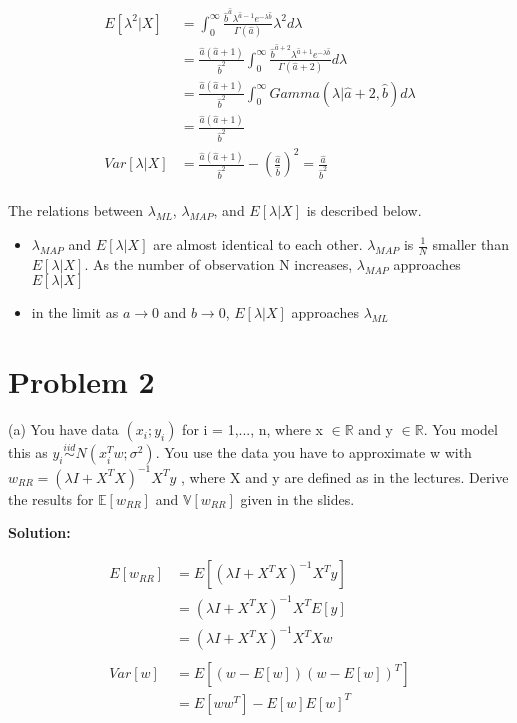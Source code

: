\documentclass[11pt]{report}
\begin{document}
\begin{equation*}
\begin{split}
E[\lambda^2|X] &= \int^{\infty}_0\frac{ \hat{b}^{\hat{a} } \lambda^{\hat{a} - 1} e^{-\lambda\hat{b}}}{\Gamma(\hat{a})} \lambda^2 d\lambda \\
&= \frac{\hat{a} (\hat{a} + 1)}{\hat{b}^2} \int^{\infty}_0 \frac{\hat{b}^{\hat{a} + 2} \lambda^{\hat{a} + 1} e^{-\lambda \hat{b}} }{\Gamma{(\hat{a} + 2)}} d\lambda \\
&= \frac{\hat{a} (\hat{a} + 1)}{\hat{b}^2} \int^{\infty}_0 Gamma(\lambda|\hat{a} + 2, \hat{b}) d\lambda \\
&= \frac{\hat{a} (\hat{a} + 1)}{\hat{b}^2} \\
Var[\lambda|X] &= \frac{\hat{a} (\hat{a} + 1)}{\hat{b}^2}  - (\frac{\hat{a}}{\hat{b}})^2 = \frac{\hat{a}}{\hat{b}^2}
\end{split} 
\end{equation*}
\\
The relations between $\lambda_{ML}$, $\lambda_{MAP}$, and $E[\lambda|X]$ is described below. 
\begin{itemize}
\item $\lambda_{MAP}$ and $E[\lambda|X]$ are almost identical to each other. $\lambda_{MAP}$ is $\frac{1}{N}$ smaller than $E[\lambda|X]$. As the number of observation N increases, $\lambda_{MAP}$ approaches $E[\lambda|X]$
\item in the limit as $a \xrightarrow{} 0$ and $b \xrightarrow{} 0$, $E[\lambda|X]$ approaches $\lambda_{ML}$
\end{itemize}

\section{Problem 2}
\justify
(a) You have data $(x_i; y_i)$ for i = 1,..., n, where x $\in  \mathbb{R}$ and y $\in \mathbb{R}$. You model this as $y_i \stackrel{iid}{\sim} N(x_i^Tw; \sigma^2)$. You use the data you have to approximate w with $w_{RR}= (\lambda I + X^TX)^{-1}X^T y$ , where X
and y are defined as in the lectures. Derive the results for $\mathbb{E}[w_{RR}]$ and $\mathbb{V}[w_{RR}]$ given in the slides.

\justify
\textbf{Solution:}

\begin{equation*}
\begin{split}
E[w_{RR}] &=  E[(\lambda I + X^TX)^{-1}X^T y] \\
&= (\lambda I + X^TX)^{-1}X^T E[y] \\
&= (\lambda I + X^TX)^{-1}X^TXw \\
\\
Var[w] &=  E[(w - E[w])(w - E[w])^T] \\
&=  E[w w^T] - E[w]E[w]^T \\
\end{split} 
\end{equation*}
\end{document}
